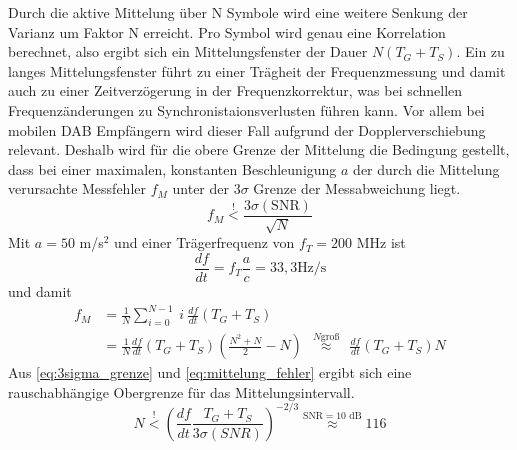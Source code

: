 Durch die aktive Mittelung über N Symbole wird eine weitere Senkung der Varianz um Faktor N erreicht. Pro Symbol wird genau eine Korrelation berechnet, also ergibt sich ein Mittelungsfenster der Dauer $N (T_G + T_S)$. Ein zu langes Mittelungsfenster führt zu einer Trägheit der Frequenzmessung und damit auch zu einer Zeitverzögerung in der Frequenzkorrektur, was bei schnellen Frequenzänderungen zu Synchronistaionsverlusten führen kann. Vor allem bei mobilen DAB Empfängern wird dieser Fall aufgrund der Dopplerverschiebung relevant. Deshalb wird für die obere Grenze der Mittelung die Bedingung gestellt, dass bei einer maximalen, konstanten Beschleunigung $a$ der durch die Mittelung verursachte Messfehler $f_M$ unter der $3\sigma$ Grenze der Messabweichung liegt.
\begin{equation}
f_M \overset{!}{<} \frac{3\sigma(\text{SNR})}{\sqrt{N}}
\label{eq:3sigma_grenze}
\end{equation}
Mit $a=50$ m/s$^2$ und einer Trägerfrequenz von $f_T = 200$ MHz ist
\begin{equation}
\frac{df}{dt} = f_T \frac{a}{c} = 33,3 \text{Hz/s}
\end{equation}
und damit
\begin{equation}
\begin{aligned}
f_M &= \frac{1}{N} \sum \limits_{i=0}^{N-1}\: i \: \frac{df}{dt} (T_G+T_S) \\
&= \frac{1}{N} \frac{df}{dt} (T_G+T_S) \left(\frac{N^2 + N}{2} - N\right) \ \ {\overset{N\text{groß}}{\approx}} \ \  \frac{df}{dt} (T_G+T_S) N
\end{aligned}
\label{eq:mittelung_fehler}
\end{equation}
Aus \ref{eq:3sigma_grenze} und \ref{eq:mittelung_fehler} ergibt sich eine rauschabhängige Obergrenze für das Mittelungsintervall.
\begin{equation}
N \overset{!}{<} \left(\frac{df}{dt}\frac{T_G + T_S}{3 \sigma(SNR)}\right)^{-2/3} \overset{\text{SNR}=10\text{ dB}}{\approx} 116
\end{equation}
